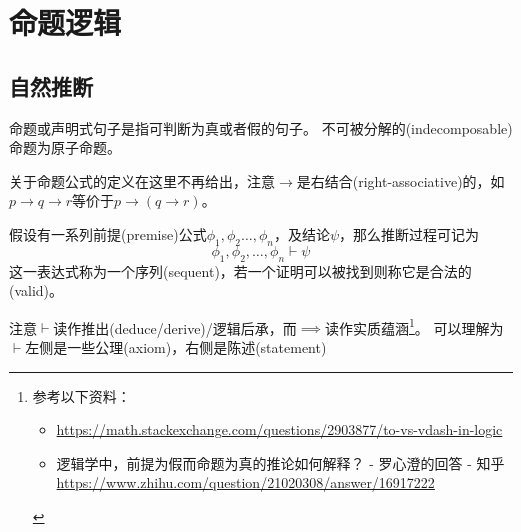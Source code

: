 
\section{命题逻辑}
\subsection{自然推断}
\begin{definition}[命题(proposition)]
命题或声明式句子是指可判断为真或者假的句子。
不可被分解的(indecomposable)命题为原子命题。
\end{definition}

关于命题公式的定义在这里不再给出，注意$\to$是右结合(right-associative)的，如$p\to q\to r$等价于$p\to(q\to r)$。

\begin{definition}
假设有一系列前提(premise)公式$\phi_1,\phi_2\ldots,\phi_n$，及结论$\psi$，那么推断过程可记为
\[\phi_1,\phi_2,\ldots,\phi_n\vdash\psi\]
这一表达式称为一个序列(sequent)，若一个证明可以被找到则称它是合法的(valid)。
\end{definition}

注意$\vdash$读作推出(deduce/derive)/逻辑后承，而$\implies$读作实质蕴涵\footnote{参考以下资料：
\begin{itemize}
	\item \url{https://math.stackexchange.com/questions/2903877/to-vs-vdash-in-logic}
	\item 逻辑学中，前提为假而命题为真的推论如何解释？ - 罗心澄的回答 - 知乎 \url{https://www.zhihu.com/question/21020308/answer/16917222}
\end{itemize}}。
可以理解为$\vdash$左侧是一些公理(axiom)，右侧是陈述(statement)

